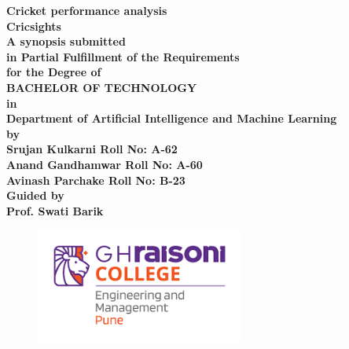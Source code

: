 \begin{center}
\renewcommand{\baselinestretch}{1.8}

{\huge \bf Cricket performance analysis}\\
\vspace{0.1 in}
{\huge \bf Cricsights}\\
\vspace{0.15 in}
{\small \bf A synopsis submitted\textcolor{white}{a}}\\
\vspace{0.15 in}
{\small \bf in Partial Fulfillment of the Requirements \textcolor{white}{a}}\\ 
\vspace{0.15 in}
{\small \bf for the Degree of\textcolor{white}{a}}\\ 
\vspace{0.15 in}
{\large \bf BACHELOR OF TECHNOLOGY\textcolor{white}{a}}\\ 
\vspace{0.15 in}
{\small \bf in\textcolor{white}{a}}\\ 
\vspace{0.15 in}
{\large \bf Department of Artificial Intelligence and Machine Learning\textcolor{white}{a}}\\ 
\vspace{0.15 in}
{\small \bf by\textcolor{white}{a}}\\ 
\vspace{0.15 in}
{\large \bf Srujan Kulkarni Roll No: A-62\textcolor{white}{a}}\\ 
\vspace{0.15 in}
{\large \bf Anand Gandhamwar Roll No: A-60\textcolor{white}{a}}\\ 
\vspace{0.15 in}
{\large \bf Avinash Parchake Roll No: B-23\textcolor{white}{a}}\\ 
\vspace{0.15 in}
{\small \bf Guided by\textcolor{white}{a}}\\ 
\vspace{0.15 in}
{\large \bf Prof. Swati Barik\textcolor{white}{a}}\\ 

\begin{figure}[!h]
\centering
\includegraphics[width=2.7in]{GHRCE_LOGO.png}
\end{figure}


\end{center}

